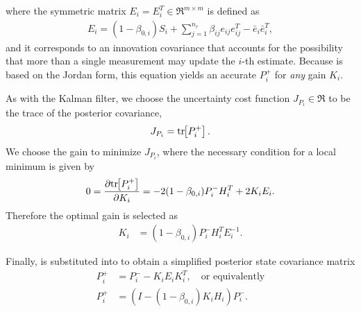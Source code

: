 where the symmetric matrix $E_i=E_i^T\in\Re^{m\times m}$ is defined as
\begin{align}
E_i=(1-\beta_{0,i})S_i+{\sum_{j=1}^{n_r} \beta_{ij}e_{ij}e_{ij}^T-{\bar{e}}_{i}}{\bar{e}}_{i}^T,\label{eqn:E}
\end{align}
and it corresponds to an innovation covariance that accounts for the possibility that more than a single measurement may update the $i$-th estimate.
Because  is based on the Jordan form, this equation yields an accurate $P^+_{i}$ for \emph{any} gain $K_i$.

As with the Kalman filter, we choose the uncertainty cost function $J_{P_i}\in\Re$ to be the trace of the posterior covariance,
\begin{align}
\label{eqn:JpIntro}
J_{P_i}=\mathrm{tr}\negthickspace\left[ P_i^+ \right].
\end{align}
We choose the gain to minimize $J_{P_i}$, where the necessary condition for a local minimum is given by
\begin{align}
0=\frac{\partial\mathrm{tr}\negthickspace\left[ P^+_i \right]}{\partial K_i}=-2(1-\beta_{0,i})P^-_iH_i^T+2K_iE_i.\label{eqn:Uncertainty0}
\end{align}
Therefore the optimal gain is selected as
\begin{align}
K_i&=(1-\beta_{0,i})P^-_iH_i^TE_i^{-1}.\label{eqn:GainK}
\end{align}

Finally,  is substituted into  to obtain a simplified posterior state covariance matrix
\begin{align}
P^+_{i}&=P^-_{i}-K_iE_iK_i^T, \quad \mbox{or equivalently}\label{eqn:JPDAFPostCovSymmetricUpdate}
\\
P^+_{i}&=\left(I-(1-\beta_{0,i})K_iH_i\right)P^-_i.\label{eqn:JPDAFPostCovSimpleUpdate}
\end{align}

